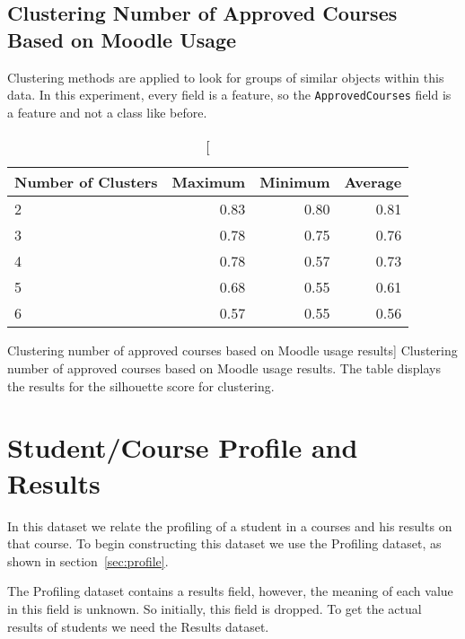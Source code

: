 \subsection{Clustering Number of Approved Courses Based on Moodle Usage}

Clustering methods are applied to look for groups of similar objects within
this data. In this experiment, every field is a feature, so the
\texttt{ApprovedCourses} field is a feature and not a class like before.

\begin{table}[h!]
    \centering

    \begin{tabular}{| l | r | r | r |}
        \hline
        \textbf{Number of Clusters} & \textbf{Maximum} & \textbf{Minimum} & \textbf{Average} \\ \hline
        2 & 0.83 & 0.80 & 0.81 \\ \hline
        3 & 0.78 & 0.75 & 0.76 \\ \hline
        4 & 0.78 & 0.57 & 0.73 \\ \hline
        5 & 0.68 & 0.55 & 0.61 \\ \hline
        6 & 0.57 & 0.55 & 0.56 \\ \hline
    \end{tabular}

    \caption
        [Clustering number of approved courses based on Moodle usage results]
        {Clustering number of approved courses based on Moodle usage results. The table displays the results for the silhouette score for clustering.}

    \label{tab:exp_004_res}
\end{table}


\section{Student/Course Profile and Results}

In this dataset we relate the profiling of a student in a courses and his
results on that course. To begin constructing this dataset we use the Profiling
dataset, as shown in section~\ref{sec:profile}.

The Profiling dataset contains a results field, however, the meaning of each
value in this field is unknown. So initially, this field is dropped. To get the
actual results of students we need the Results dataset.

